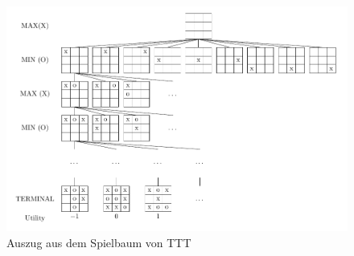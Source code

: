 \begin{figure}[h]
    \centering
    \includegraphics[scale=0.7]{04_Artefakte/01_Abbildungen/ttt_boards/ttt_tree.pdf}
    \caption[Auszug aus dem Spielbaum von \acs{TTT}]{Auszug aus dem Spielbaum von \acs{TTT} \protect\footnotemark}
    \label{fig:ttt_tree}
\end{figure}

